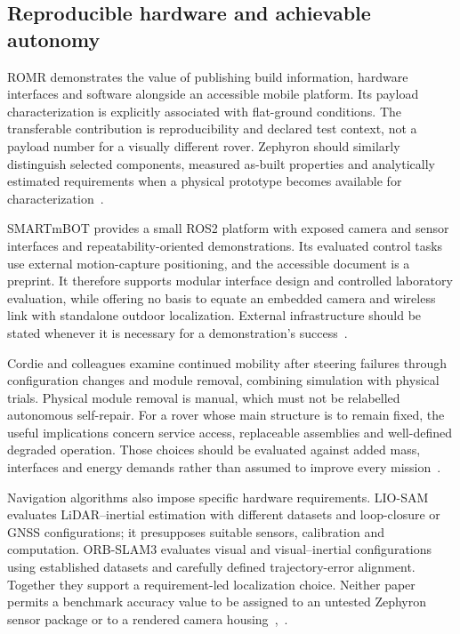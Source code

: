 \documentclass[11pt,letterpaper]{article}
\begin{document}
\subsection{Reproducible hardware and achievable autonomy}

ROMR demonstrates the value of publishing build information, hardware interfaces and software alongside an accessible mobile platform. Its payload characterization is explicitly associated with flat-ground conditions. The transferable contribution is reproducibility and declared test context, not a payload number for a visually different rover. Zephyron should similarly distinguish selected components, measured as-built properties and analytically estimated requirements when a physical prototype becomes available for characterization~\cite{LIT_ROMR2023}.

SMARTmBOT provides a small ROS2 platform with exposed camera and sensor interfaces and repeatability-oriented demonstrations. Its evaluated control tasks use external motion-capture positioning, and the accessible document is a preprint. It therefore supports modular interface design and controlled laboratory evaluation, while offering no basis to equate an embedded camera and wireless link with standalone outdoor localization. External infrastructure should be stated whenever it is necessary for a demonstration's success~\cite{LIT_SMART2022}.

Cordie and colleagues examine continued mobility after steering failures through configuration changes and module removal, combining simulation with physical trials. Physical module removal is manual, which must not be relabelled autonomous self-repair. For a rover whose main structure is to remain fixed, the useful implications concern service access, replaceable assemblies and well-defined degraded operation. Those choices should be evaluated against added mass, interfaces and energy demands rather than assumed to improve every mission~\cite{LIT_MODULAR2024}.

Navigation algorithms also impose specific hardware requirements. LIO-SAM evaluates LiDAR--inertial estimation with different datasets and loop-closure or GNSS configurations; it presupposes suitable sensors, calibration and computation. ORB-SLAM3 evaluates visual and visual--inertial configurations using established datasets and carefully defined trajectory-error alignment. Together they support a requirement-led localization choice. Neither paper permits a benchmark accuracy value to be assigned to an untested Zephyron sensor package or to a rendered camera housing~\cite{LIT_LIOSAM2020},~\cite{LIT_ORBSLAM2021}.
\end{document}
